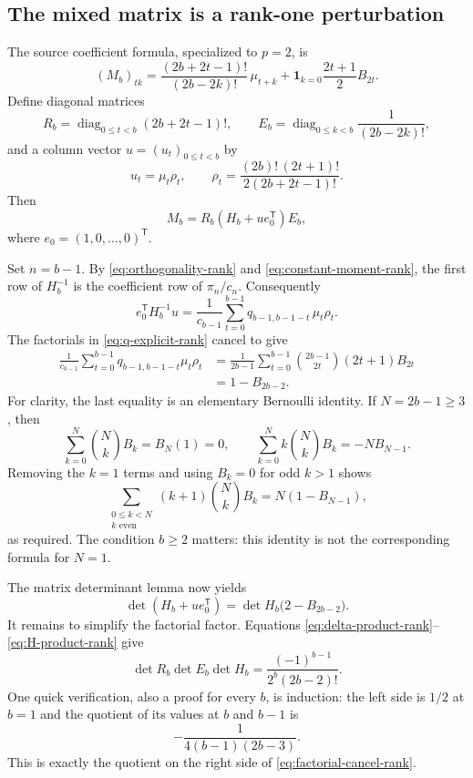 \documentclass[11pt,a4paper]{article}
\numberwithin{equation}{section}
\theoremstyle{plain}
\theoremstyle{definition}
\theoremstyle{remark}
\begin{document}
\subsection{The mixed matrix is a rank-one perturbation}

The source coefficient formula, specialized to $p=2$, is
\begin{equation}\label{eq:rank-two-entry}
 (M_b)_{tk}
 =\frac{(2b+2t-1)!}{(2b-2k)!}\,\mu_{t+k}
   +\mathbf1_{k=0}\frac{2t+1}{2}B_{2t}.
\end{equation}
Define diagonal matrices
\[
 R_b=\operatorname{diag}_{0\leq t<b}(2b+2t-1)!,\qquad
 E_b=\operatorname{diag}_{0\leq k<b}\frac1{(2b-2k)!},
\]
and a column vector $u=(u_t)_{0\leq t<b}$ by
\[
 u_t=\mu_t\rho_t,\qquad
 \rho_t=\frac{(2b)!\,(2t+1)!}{2(2b+2t-1)!}.
\]
Then
\begin{equation}\label{eq:rank-one-factor}
 M_b=R_b(H_b+u e_0^{\mathsf T})E_b,
\end{equation}
where $e_0=(1,0,\ldots,0)^{\mathsf T}$.

Set $n=b-1$.  By \eqref{eq:orthogonality-rank} and
\eqref{eq:constant-moment-rank}, the first row of $H_b^{-1}$ is the
coefficient row of $\pi_n/c_n$.  Consequently
\begin{equation}\label{eq:contraction-rank}
 e_0^{\mathsf T}H_b^{-1}u
 =\frac1{c_{b-1}}\sum_{t=0}^{b-1}q_{b-1,b-1-t}\,\mu_t\rho_t.
\end{equation}
The factorials in \eqref{eq:q-explicit-rank} cancel to give
\begin{align}
 \frac1{c_{b-1}}\sum_{t=0}^{b-1}
       q_{b-1,b-1-t}\mu_t\rho_t
 &=\frac1{2b-1}\sum_{t=0}^{b-1}
       \binom{2b-1}{2t}(2t+1)B_{2t}\\
 &=1-B_{2b-2}.
       \label{eq:bernoulli-contraction-rank}
\end{align}
For clarity, the last equality is an elementary Bernoulli identity.
If $N=2b-1\geq3$, then
\[
 \sum_{k=0}^N\binom NkB_k=B_N(1)=0,
 \qquad
 \sum_{k=0}^Nk\binom NkB_k=-NB_{N-1}.
\]
Removing the $k=1$ terms and using $B_k=0$ for odd $k>1$ shows
\[
 \sum_{\substack{0\leq k<N\\ k\text{ even}}}
      (k+1)\binom NkB_k=N(1-B_{N-1}),
\]
as required.  The condition $b\geq2$ matters: this identity is not
the corresponding formula for $N=1$.

The matrix determinant lemma now yields
\[
 \det(H_b+u e_0^{\mathsf T})
 =\det H_b\bigl(2-B_{2b-2}\bigr).
\]
It remains to simplify the factorial factor.  Equations
\eqref{eq:delta-product-rank}--\eqref{eq:H-product-rank} give
\begin{equation}\label{eq:factorial-cancel-rank}
 \det R_b\det E_b\det H_b
 =\frac{(-1)^{b-1}}{2^b(2b-2)!}.
\end{equation}
One quick verification, also a proof for every $b$, is induction:
the left side is $1/2$ at $b=1$ and the quotient of its values at
$b$ and $b-1$ is
\[
 -\frac1{4(b-1)(2b-3)}.
\]
This is exactly the quotient on the right side of
\eqref{eq:factorial-cancel-rank}.
\end{document}
